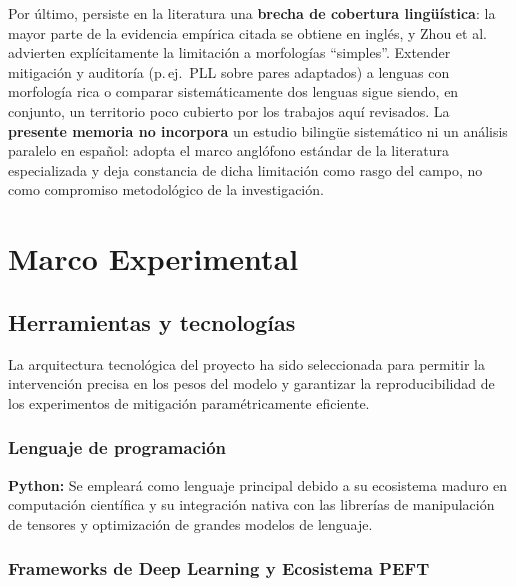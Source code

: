 \documentclass[12pt,a4paper]{report}
\begin{document}
Por último, persiste en la literatura una \textbf{brecha de cobertura lingüística}: la mayor parte de la evidencia empírica citada se obtiene en inglés, y Zhou et al.\ \cite{zhou_evaluating_2024} advierten explícitamente la limitación a morfologías ``simples''. Extender mitigación y auditoría (p.\,ej.\ PLL sobre pares adaptados) a lenguas con morfología rica o comparar sistemáticamente dos lenguas sigue siendo, en conjunto, un territorio poco cubierto por los trabajos aquí revisados. La \textbf{presente memoria no incorpora} un estudio bilingüe sistemático ni un análisis paralelo en español: adopta el marco anglófono estándar de la literatura especializada y deja constancia de dicha limitación como rasgo del campo, no como compromiso metodológico de la investigación.
\fussy


\chapter{Marco Experimental}
\label{chap:marco_experimental}

\section{Herramientas y tecnologías}
\label{sec:herramientas}


La arquitectura tecnológica del proyecto ha sido seleccionada para permitir la intervención precisa en los pesos del modelo y garantizar la reproducibilidad de los experimentos de mitigación paramétricamente eficiente.


\subsection{Lenguaje de programación}
\label{subsec:lenguaje}

\textbf{Python:} Se empleará como lenguaje principal debido a su ecosistema maduro en computación científica y su integración nativa con las librerías de manipulación de tensores y optimización de grandes modelos de lenguaje.

\subsection{Frameworks de Deep Learning y Ecosistema PEFT}
\label{subsec:frameworks}
\end{document}
